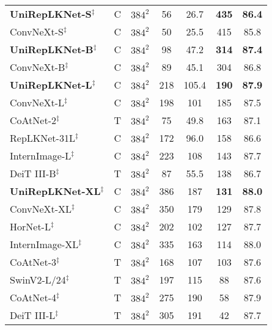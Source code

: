 \documentclass[10pt,twocolumn,letterpaper]{article}
\begin{document}
\begin{table}[t!]
\begin{tabular}{l|c|c|c|c|c|c}
\rowcolor{gray!20}
    \textbf{UniRepLKNet-S}$^\ddagger$  & C & $384^2$   &    56 &  26.7    &   \textbf{435}         &   \textbf{86.4}  \\
    ConvNeXt-S$^\ddagger$~\cite{liu2022convnet}  &   C   &   $384^2$     &   50  &   25.5    & 415   &   85.8\\
\rowcolor{gray!20}
    \textbf{UniRepLKNet-B}$^\ddagger$  & C & $384^2$    &   98    &   47.2    &   \textbf{314}     &   \textbf{87.4}\\
    ConvNeXt-B$^\ddagger$~\cite{liu2022convnet}  & C &   $384^2$ &   89  &   45.1   & 304 &   86.8\\
    \hline
    \rowcolor{gray!20}
    \textbf{UniRepLKNet-L}$^\ddagger$  & C & $384^2$    &   218   &   105.4   &   \textbf{190}     &   \textbf{87.9}\\
    ConvNeXt-L$^\ddagger$~\cite{liu2022convnet} & C &$384^2$ & 198 & 101  &   185 & 87.5\\
    CoAtNet-2$^\ddagger$~\cite{dai2021coatnet} & T &$384^2$ & 75 & 49.8      &   163  & 87.1      \\
    RepLKNet-31L$^\ddagger$~\cite{ding2022scaling} & C &$384^2$ & 172   & 96.0    &  158 &   86.6\\
    InternImage-L$^\ddagger$~\cite{wang2023internimage}    & C &$384^2$ & 223 & 108 & 143    &   87.7 \\
    DeiT III-B$^\ddagger$~\cite{touvron2022deit} & T &$384^2$  & 87 & 55.5           & 138    & 86.7    \\
    \hline
    \rowcolor{gray!20}
    \textbf{UniRepLKNet-XL}$^\ddagger$  & C & $384^2$   &   386   &   187   &   \textbf{131}     &   \textbf{88.0}\\
    ConvNeXt-XL$^\ddagger$~\cite{liu2022convnet} & C &$384^2$ & 350 & 179 &   129 & 87.8\\
    
    HorNet-L$^\ddagger$~\cite{rao2022hornet} & C & $384^2$ & 202 & 102 & 127  &87.7 \\
    InternImage-XL$^\ddagger$~\cite{wang2023internimage}   & C &$384^2$ & 335 & 163 & 114    &   88.0 \\


    
    CoAtNet-3$^\ddagger$~\cite{dai2021coatnet} & T &$384^2$ & 168 & 107    &   103  & 87.6    \\
    SwinV2-L/24$^\ddagger$~\cite{liu2022swin} & T &$384^2$ & 197 & 115    &   88   & 87.6\\
    CoAtNet-4$^\ddagger$~\cite{dai2021coatnet} & T &$384^2$ & 275 & 190    &   58   & 87.9    \\
    DeiT III-L$^\ddagger$~\cite{touvron2022deit} & T &$384^2$  & 305 & 191         & 42     & 87.7    \\


    
    \hline
        
\end{tabular}     \vspace{-0.2in}
    \label{table-imgnet}
\end{table}
\end{document}
